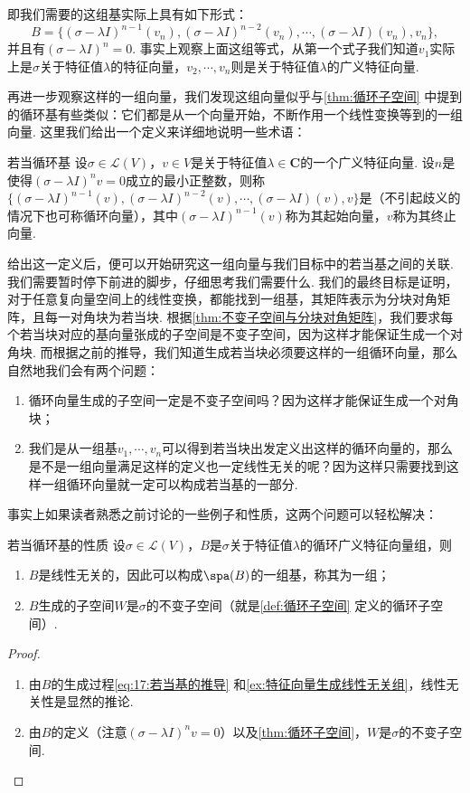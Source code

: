 即我们需要的这组基实际上具有如下形式：
\[B=\{(\sigma-\lambda I)^{n-1}(v_n),(\sigma-\lambda I)^{n-2}(v_n),\cdots,(\sigma-\lambda I)(v_n),v_n\},\]
并且有$(\sigma-\lambda I)^n=0$. 事实上观察上面这组等式，从第一个式子我们知道$v_1$实际上是$\sigma$关于特征值$\lambda$的特征向量，$v_2,\cdots,v_n$则是关于特征值$\lambda$的广义特征向量.

再进一步观察这样的一组向量，我们发现这组向量似乎与\autoref{thm:循环子空间} 中提到的循环基有些类似：它们都是从一个向量开始，不断作用一个线性变换等到的一组向量. 这里我们给出一个定义来详细地说明一些术语：
\begin{definition}{}{若当循环基}
    设$\sigma\in\mathcal{L}(V)$，$v\in V$是关于特征值$\lambda\in\mathbf{C}$的一个广义特征向量. 设$n$是使得$(\sigma-\lambda I)^n v=0$成立的最小正整数，则称$\{(\sigma-\lambda I)^{n-1}(v),(\sigma-\lambda I)^{n-2}(v),\cdots,(\sigma-\lambda I)(v),v\}$是（不引起歧义的情况下也可称循环向量），其中$(\sigma-\lambda I)^{n-1}(v)$称为其起始向量，$v$称为其终止向量.
\end{definition}

给出这一定义后，便可以开始研究这一组向量与我们目标中的若当基之间的关联. 我们需要暂时停下前进的脚步，仔细思考我们需要什么. 我们的最终目标是证明，对于任意复向量空间上的线性变换，都能找到一组基，其矩阵表示为分块对角矩阵，且每一对角块为若当块. 根据\autoref{thm:不变子空间与分块对角矩阵}，我们要求每个若当块对应的基向量张成的子空间是不变子空间，因为这样才能保证生成一个对角块. 而根据之前的推导，我们知道生成若当块必须要这样的一组循环向量，那么自然地我们会有两个问题：
\begin{enumerate}
    \item 循环向量生成的子空间一定是不变子空间吗？因为这样才能保证生成一个对角块；
    \item 我们是从一组基$v_1,\cdots,v_n$可以得到若当块出发定义出这样的循环向量的，那么是不是一组向量满足这样的定义也一定线性无关的呢？因为这样只需要找到这样一组循环向量就一定可以构成若当基的一部分.
\end{enumerate}
事实上如果读者熟悉之前讨论的一些例子和性质，这两个问题可以轻松解决：
\begin{theorem}{}{若当循环基的性质}
    设$\sigma\in\mathcal{L}(V)$，$B$是$\sigma$关于特征值$\lambda$的循环广义特征向量组，则
    \begin{enumerate}
        \item $B$是线性无关的，因此可以构成$\spa(B)$的一组基，称其为一组；
        \item $B$生成的子空间$W$是$\sigma$的不变子空间（就是\autoref{def:循环子空间} 定义的循环子空间）.
    \end{enumerate}
\end{theorem}
\begin{proof}
    \begin{enumerate}
        \item 由$B$的生成过程\autoref{eq:17:若当基的推导} 和\autoref{ex:特征向量生成线性无关组}，线性无关性是显然的推论.
        \item 由$B$的定义（注意$(\sigma-\lambda I)^n v=0$）以及\autoref{thm:循环子空间}，$W$是$\sigma$的不变子空间.
    \end{enumerate}
\end{proof}

